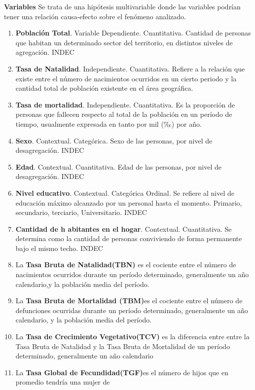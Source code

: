 \documentclass{article}
\theoremstyle{mytheoremstyle}
\theoremstyle{mytheoremstyle}
\theoremstyle{myproblemstyle}
\begin{document}
\textbf{Variables}
Se trata de una hipótesis multivariable donde las variables podrían tener una relación causa-efecto sobre el fenómeno analizado.
\begin{enumerate}
  \item \textbf{Población Total}. Variable Dependiente. Cuantitativa. Cantidad de personas que habitan un determinado sector del territorio, en distintos niveles de agregación. INDEC
  \item \textbf{Tasa de Natalidad}. Independiente. Cuantitativa. Refiere a la relación que existe entre el número de nacimientos ocurridos en un cierto periodo y la cantidad total de población existente en el área geográfica. 
  \item \textbf{Tasa de mortalidad}. Independiente. Cuantitativa. Es la proporción de personas que fallecen respecto al total de la población en un período de tiempo, usualmente expresada en tanto por mil (‰) por año.
  \item \textbf{Sexo}. Contextual. Categórica. Sexo de las personas, por nivel de desagregación. INDEC
  \item \textbf{Edad}. Contextual. Cuantitativa. Edad de las personas, por nivel de desagregación. INDEC
  \item\textbf{Nivel educativo}.  Contextual. Categórica Ordinal.  Se refiere al nivel de educación máximo alcanzado por un personal hasta el momento. Primario, secundario, terciario, Universitario. INDEC
  \item \textbf{Cantidad de h abitantes en el hogar}. Contextual. Cuantitativa.  Se determina como la cantidad de personas conviviendo de forma permanente bajo el mismo techo. INDEC
  \item La \textbf{Tasa Bruta de Natalidad(TBN)} es el cociente entre el número de nacimientos ocurridos durante un período determinado, 
  generalmente un año calendario,y la población media del período.
   \item	La  \textbf{Tasa Bruta de Mortalidad (TBM)}es el cociente entre el número de defunciones ocurridas durante un período determinado, 
   generalmente un año calendario, y la población media del período.
   \item La \textbf{Tasa de Crecimiento Vegetativo(TCV)} es la diferencia entre entre la Tasa Bruta de Natalidad 
   y la Tasa Bruta de Mortalidad de un período determinado, generalmente un año calendario
   \item  La \textbf{Tasa Global de Fecundidad(TGF)}es el número de hijos que en promedio tendría una mujer de

\end{enumerate}
\end{document}
